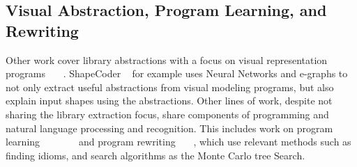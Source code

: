 \subsection{Visual Abstraction, Program Learning, and Rewriting}
Other work cover library abstractions with a focus on visual representation programs~\cite{jones2023shapecoder} ~\cite{wang2021learningVisAbst}~\cite{Jones_2021}. ShapeCoder ~\cite{jones2023shapecoder}  for example uses Neural Networks and e-graphs to not only extract useful abstractions from visual modeling programs, but also explain input shapes using the abstractions. 
Other lines of work, despite not sharing the library extraction focus, share components of programming and natural language processing and recognition. This includes work on program learning~\cite{cropper2019playgol}~\cite{DBLP:journals/corr/abs-2004-09931refproginduc}~\cite{wong2022leveraging}  ~\cite{demo}~\cite{iyer2019learning} ~\cite{hocquette2024learning} and program rewriting~\cite{brandfonbrener2024verified} ~\cite{DBLP:conf/sat/NotzliRBNPBT19rewrite}~\cite{ganeshan2023improving}, which use relevant methods such as finding idioms, and search algorithms as the Monte Carlo tree Search. 
